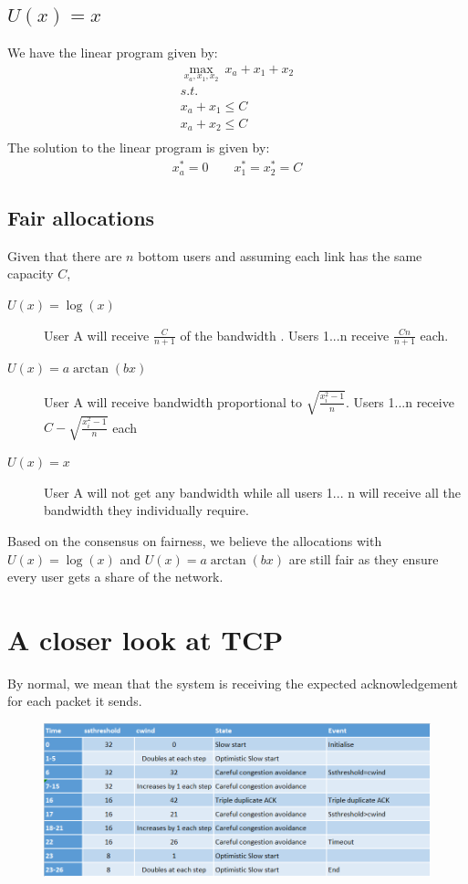 \documentclass[]{article}
\begin{document}
\subsection{$U(x) = x$}

We have the linear program given by:
\begin{gather*}
\underset{x_a, x_1, x_2}{\max}\ x_a + x_1 + x_2 \\
s.t. \\
x_a + x_1 \leq C \\
x_a + x_2 \leq C \\
\end{gather*}
The solution to the linear program is given by:
\begin{gather*}
x_a^* = 0 \qquad x_1^* = x_2^* = C
\end{gather*}

\subsection{Fair allocations}

Given that there are $n$ bottom users and assuming each link has the same capacity $C$,
\begin{description}
\item[$U(x) = \log(x)$] User A will receive $\frac{C}{n + 1}$ of the bandwidth . Users 1...n receive $\frac{Cn}{n+1}$ each.
\item[$U(x) = a \arctan (bx)$] User A will receive bandwidth proportional to $\sqrt{\frac{x_i^2 - 1}{n}}$. Users 1...n receive $C - \sqrt{\frac{x_i^2 - 1}{n}}$ each
\item[$U(x) = x$] User A will not get any bandwidth while all users 1... n will receive all the bandwidth they individually require.
\end{description}

Based on the consensus on fairness, we believe the allocations with $U(x) = \log(x)$ and $U(x) = a \arctan (bx)$ are still fair as they ensure every user gets a share of the network.


\section{A closer look at TCP}

By normal, we mean that the system is receiving the expected acknowledgement for each packet it sends.

\begin{figure}[H]
\centering
\includegraphics[width=\linewidth]{f1.png}
\end{figure}
\end{document}
